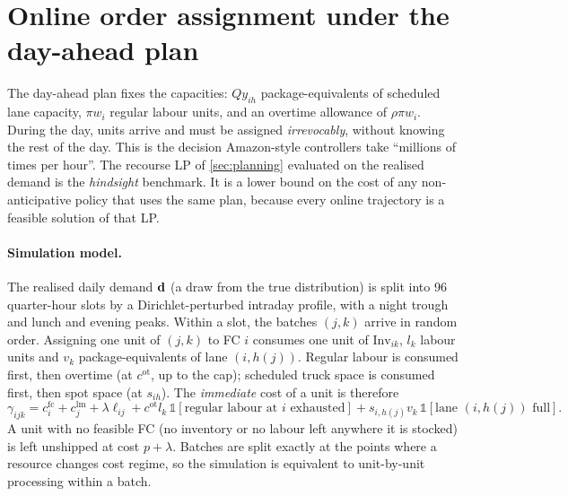 \section{Online order assignment under the day-ahead plan}\label{sec:online}

The day-ahead plan fixes the capacities: $Q y_{ih}$ package-equivalents of scheduled lane capacity, $\pi w_i$ regular labour units, and an overtime allowance of $\rho\pi w_i$.
During the day, units arrive and must be assigned \emph{irrevocably}, without knowing the rest of the day.
This is the decision Amazon-style controllers take ``millions of times per hour''.
The recourse LP of \cref{sec:planning} evaluated on the realised demand is the \emph{hindsight} benchmark.
It is a lower bound on the cost of any non-anticipative policy that uses the same plan, because every online trajectory is a feasible solution of that LP.

\paragraph{Simulation model.}
The realised daily demand $\mathbf{d}$ (a draw from the true distribution) is split into 96 quarter-hour slots by a Dirichlet-perturbed intraday profile, with a night trough and lunch and evening peaks.
Within a slot, the batches $(j,k)$ arrive in random order.
Assigning one unit of $(j,k)$ to FC $i$ consumes one unit of $\mathrm{Inv}_{ik}$, $l_k$ labour units and $v_k$ package-equivalents of lane $(i,h(j))$.
Regular labour is consumed first, then overtime (at $c^{\mathrm{ot}}$, up to the cap); scheduled truck space is consumed first, then spot space (at $s_{ih}$).
The \emph{immediate} cost of a unit is therefore
\[
  \gamma_{ijk} = c^{\mathrm{fc}}_i + c^{\mathrm{lm}}_j + \lambda\ell_{ij}
   + c^{\mathrm{ot}} l_k\,\mathbb{1}[\text{regular labour at $i$ exhausted}]
   + s_{i,h(j)} v_k\,\mathbb{1}[\text{lane $(i,h(j))$ full}].
\]
A unit with no feasible FC (no inventory or no labour left anywhere it is stocked) is left unshipped at cost $p+\lambda$.
Batches are split exactly at the points where a resource changes cost regime, so the simulation is equivalent to unit-by-unit processing within a batch.

